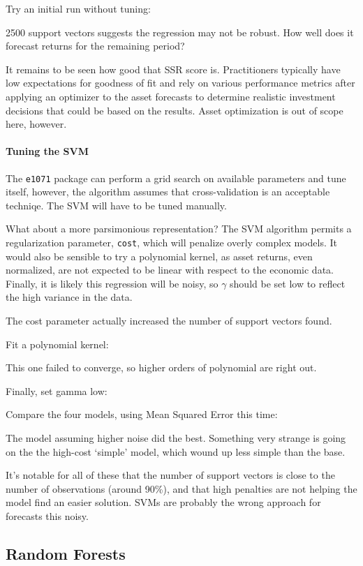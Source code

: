 \documentclass[]{article}
\let\oldparagraph\paragraph
\renewcommand{\paragraph}[1]{\oldparagraph{#1}\mbox{}}
\begin{document}
Try an initial run without tuning:

2500 support vectors suggests the regression may not be robust. How well
does it forecast returns for the remaining period?

It remains to be seen how good that SSR score is. Practitioners
typically have low expectations for goodness of fit and rely on various
performance metrics after applying an optimizer to the asset forecasts
to determine realistic investment decisions that could be based on the
results. Asset optimization is out of scope here, however.

\paragraph{Tuning the SVM}\label{tuning-the-svm}

The \texttt{e1071} package can perform a grid search on available
parameters and tune itself, however, the algorithm assumes that
cross-validation is an acceptable techniqe. The SVM will have to be
tuned manually.

What about a more parsimonious representation? The SVM algorithm permits
a regularization parameter, \texttt{cost}, which will penalize overly
complex models. It would also be sensible to try a polynomial kernel, as
asset returns, even normalized, are not expected to be linear with
respect to the economic data. Finally, it is likely this regression will
be noisy, so \(\gamma\) should be set low to reflect the high variance
in the data.

The cost parameter actually increased the number of support vectors
found.

Fit a polynomial kernel:

This one failed to converge, so higher orders of polynomial are right
out.

Finally, set gamma low:

Compare the four models, using Mean Squared Error this time:

The model assuming higher noise did the best. Something very strange is
going on the the high-cost `simple' model, which wound up less simple
than the base.

It's notable for all of these that the number of support vectors is
close to the number of observations (around 90\%), and that high
penalties are not helping the model find an easier solution. SVMs are
probably the wrong approach for forecasts this noisy.

\subsection{Random Forests}\label{random-forests}
\end{document}
